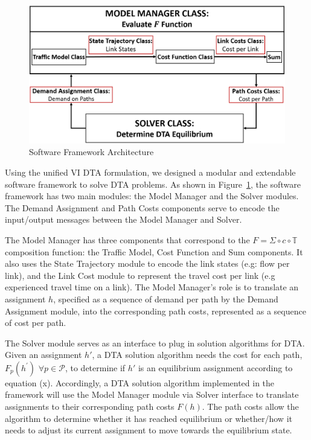 \documentclass[conference]{IEEEtran}
\renewcommand{\:}{\mathrel{\coloneqq}}
\renewcommand{\=}{\ensuremath{\eqqcolon}}
\newcommand{\0}{\ensuremath{\boldsymbol{0}}}
\begin{document}
\begin{figure}[h]
    \centering
    \includegraphics[width=\linewidth]{Class_Diagram.PNG}
    \caption{Software Framework Architecture}
    \label{fig:class_diagram}
\end{figure}

Using the unified VI DTA formulation, we designed a modular and extendable software framework to solve DTA problems. As shown in Figure~\ref{fig:class_diagram}, the software framework has two main modules: the Model Manager and the Solver modules. The Demand Assignment and Path Costs components serve to encode the input/output messages between the Model Manager and Solver.

The Model Manager has three components that correspond to the $F = \Sigma\circ c \circ \mathbb{T}$ composition function: the Traffic Model, Cost Function and Sum components. It also uses the State Trajectory module to encode the link states (e.g: flow per link), and the Link Cost module to represent the travel cost per link (e.g experienced travel time on a link). The Model Manager's role is to translate an assignment $h$, specified as a sequence of demand per path by the Demand Assignment module, into the corresponding path costs, represented as a sequence of cost per path.

The Solver module serves as an interface to plug in solution algorithms for DTA. Given an assignment $h'$, a DTA solution algorithm needs the cost for each path, $F_p(h^')$ $\forall p\in\mathcal{P}$, to determine if $h'$ is an equilibrium assignment according to equation (x). Accordingly, a DTA solution algorithm implemented in the framework will use the Model Manager module via Solver interface to translate assignments to their corresponding path costs $F(h)$. The path costs allow the algorithm to determine whether it has reached equilibrium or whether/how it needs to adjust its current assignment to move towards the equilibrium state. 
\end{document}
